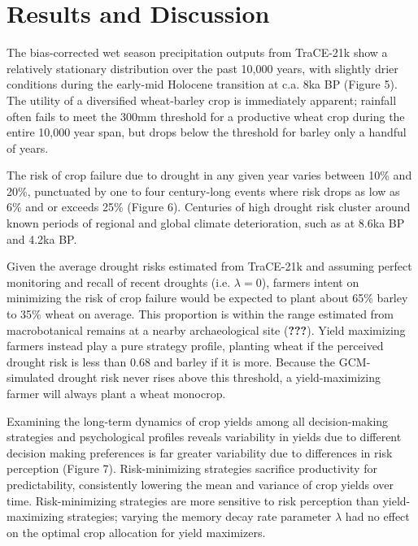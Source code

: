 \documentclass[smallextended]{svjour3}       %
\begin{document}
\section{Results and Discussion}

The bias-corrected wet season precipitation outputs from TraCE-21k show
a relatively stationary distribution over the past 10,000 years, with
slightly drier conditions during the early-mid Holocene transition at
c.a. 8ka BP (Figure 5). The utility of a diversified wheat-barley crop
is immediately apparent; rainfall often fails to meet the 300mm
threshold for a productive wheat crop during the entire 10,000 year
span, but drops below the threshold for barley only a handful of years.

The risk of crop failure due to drought in any given year varies between
10\% and 20\%, punctuated by one to four century-long events where risk
drops as low as 6\% and or exceeds 25\% (Figure 6). Centuries of high
drought risk cluster around known periods of regional and global climate
deterioration, such as at 8.6ka BP and 4.2ka BP.

Given the average drought risks estimated from TraCE-21k and assuming
perfect monitoring and recall of recent droughts (i.e. \(\lambda = 0\)),
farmers intent on minimizing the risk of crop failure would be expected
to plant about 65\% barley to 35\% wheat on average. This proportion is
within the range estimated from macrobotanical remains at a nearby
archaeological site ({\textbf{???}}). Yield maximizing farmers instead
play a pure strategy profile, planting wheat if the perceived drought
risk is less than 0.68 and barley if it is more. Because the
GCM-simulated drought risk never rises above this threshold, a
yield-maximizing farmer will always plant a wheat monocrop.

Examining the long-term dynamics of crop yields among all
decision-making strategies and psychological profiles reveals
variability in yields due to different decision making preferences is
far greater variability due to differences in risk perception (Figure
7). Risk-minimizing strategies sacrifice productivity for
predictability, consistently lowering the mean and variance of crop
yields over time. Risk-minimizing strategies are more sensitive to risk
perception than yield-maximizing strategies; varying the memory decay
rate parameter \(\lambda\) had no effect on the optimal crop allocation
for yield maximizers.
\end{document}
